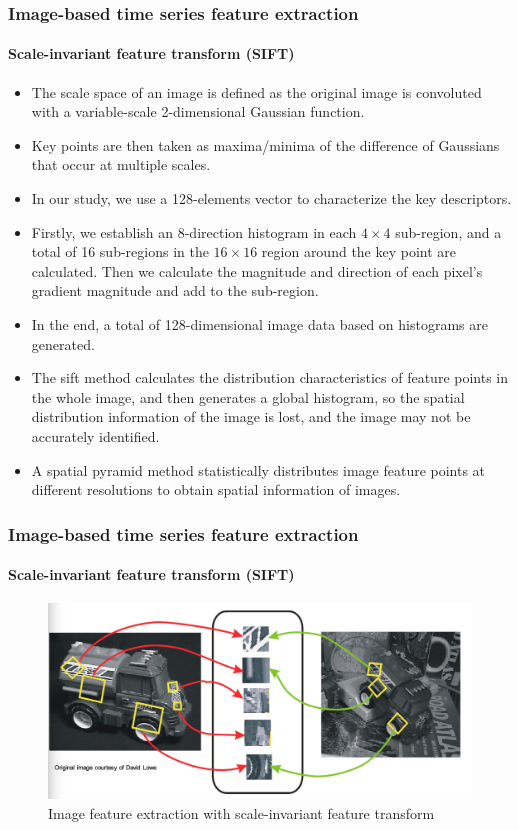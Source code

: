 \documentclass[10pt,aspectratio=43]{beamer}
\begin{document}
\begin{frame}
  \frametitle{Image-based time series feature extraction}
  \framesubtitle{Scale-invariant feature transform (SIFT)}

  \begin{itemize}
  \item The scale space of an image is defined as the original image is convoluted with a
    variable-scale 2-dimensional Gaussian function.
  \item Key points are then taken as maxima/minima of the difference of Gaussians that occur at multiple scales.

  \item In our study, we use a 128-elements vector to characterize the key descriptors.
  \item Firstly, we establish an 8-direction histogram in each $4 \times 4$ sub-region, and a
    total of 16 sub-regions in the $16 \times 16$ region around the key point are
    calculated. Then we calculate the magnitude and direction of each pixel's gradient
    magnitude and add to the sub-region.
  \item In the end, a total of 128-dimensional image data based on histograms are
    generated.
  \item The sift method calculates the distribution characteristics of feature points in
    the whole image, and then generates a global histogram, so the spatial distribution
    information of the image is lost, and the image may not be accurately identified.

  \item A spatial pyramid method statistically distributes image feature points at
    different resolutions to obtain spatial information of images.
  \end{itemize}
\end{frame}

\begin{frame}
  \frametitle{Image-based time series feature extraction}
  \framesubtitle{Scale-invariant feature transform (SIFT)}

\begin{figure}
  \centering \includegraphics[width=1\linewidth]{figures/sift.png}
  \caption{Image feature extraction with scale-invariant feature transform}
  \label{fig:Feature extraction with SIFT}
\end{figure}

\end{frame}
\end{document}
